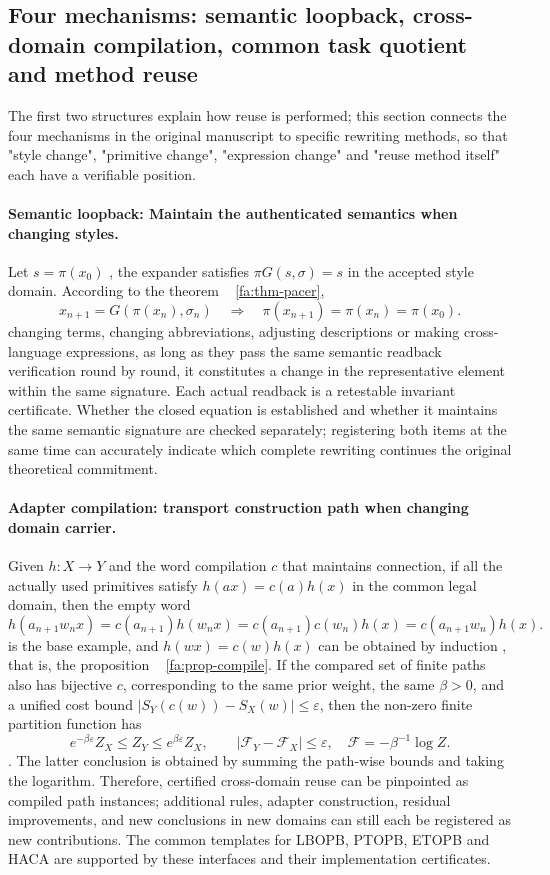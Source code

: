 \documentclass[11pt,a4paper]{article}
\theoremstyle{plain}
\theoremstyle{definition}
\theoremstyle{remark}
\begin{document}
\begin{CJK*}
\subsection { Four mechanisms: semantic loopback, cross-domain compilation, common task quotient and method reuse }\label{ar:four-mechanisms}


The first two structures explain how reuse is performed; this section connects the four mechanisms in the original manuscript to specific rewriting methods, so that "style change", "primitive change", "expression change" and "reuse method itself" each have a verifiable position.

\paragraph { Semantic loopback: Maintain the authenticated semantics when changing styles. } Let $s=\pi(x_0)$ , the expander satisfies $\pi G(s,\sigma)=s$ in the accepted style domain. According to the theorem ~ \ref{fa:thm-pacer}, \[
 x_{n+1}=G(\pi(x_n),\sigma_n)
 \quad\Longrightarrow\quad
 \pi(x_{n+1})=\pi(x_n)=\pi(x_0).
\] changing terms, changing abbreviations, adjusting descriptions or making cross-language expressions, as long as they pass the same semantic readback verification round by round, it constitutes a change in the representative element within the same signature. Each actual readback is a retestable invariant certificate. Whether the closed equation is established and whether it maintains the same semantic signature are checked separately; registering both items at the same time can accurately indicate which complete rewriting continues the original theoretical commitment. \cite{S12}

\paragraph { Adapter compilation: transport construction path when changing domain carrier. } Given $h:X\to Y$ and the word compilation $c$ that maintains connection, if all the actually used primitives satisfy $h(ax)=c(a)h(x)$ in the common legal domain, then the empty word \[
 h(a_{n+1}w_nx)
 =c(a_{n+1})h(w_nx)
 =c(a_{n+1})c(w_n)h(x)
 =c(a_{n+1}w_n)h(x).
\] is the base example, and $h(wx)=c(w)h(x)$ can be obtained by induction , that is, the proposition ~ \ref{fa:prop-compile}. If the compared set of finite paths also has bijective $c$, corresponding to the same prior weight, the same $\beta>0$, and a unified cost bound $|S_Y(c(w))-S_X(w)|\le\varepsilon$, then the non-zero finite partition function has \[
 e^{-\beta\varepsilon}Z_X\le Z_Y\le e^{\beta\varepsilon}Z_X,
 \qquad
 |\mathcal F_Y-\mathcal F_X|\le\varepsilon,
 \quad \mathcal F=-\beta^{-1}\log Z.
\]. The latter conclusion is obtained by summing the path-wise bounds and taking the logarithm. Therefore, certified cross-domain reuse can be pinpointed as compiled path instances; additional rules, adapter construction, residual improvements, and new conclusions in new domains can still each be registered as new contributions. The common templates for LBOPB, PTOPB, ETOPB and HACA are supported by these interfaces and their implementation certificates. \cite{S04,S13,S14}


\end{CJK*}
\end{document}
